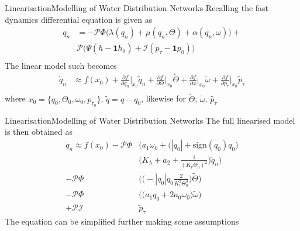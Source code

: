 \begin{frame}{Linearisation}{Modelling of Water Distribution Networks}
	Recalling the fast dynamics differential equation is given as
	\begin{equation}\label{eq:NonLinearModelSimplified}
		\begin{split}
			\dot{q}_n &=  -\mathcal{P}\Phi\Big(\lambda(q_n)+\mu(q_n,\Theta)+\alpha(q_n,\omega)\Big) +\\ &\mathcal{P}\Big(\Psi(\bar{h}-\mathbf{1}h_0) + \mathcal{I}(p_{\tau}-\mathbf{1}p_0)\Big) \\
		\end{split}	
	\end{equation}
	The linear model such becomes
	\begin{equation}\label{eq:SymbolicLinearisation}
		\begin{split}
			\dot{q}_n &\approx f(x_0) + \frac{\partial f}{\partial q_n}\bigg\rvert_{x_0} \tilde{q}_n + \frac{\partial f}{\partial \Theta}\bigg\rvert_{x_0} \tilde{\Theta} + \frac{\partial f}{\partial \omega}\bigg\rvert_{x_0} \tilde{\omega} +  \frac{\partial f}{\partial p_\tau}\bigg\rvert_{x_0} \tilde{p}_\tau
			\\
		\end{split}
	\end{equation}
	where $x_0 = \{q_0,\Theta_0,\omega_0, p_{\tau_0} \}$, $ \tilde{q} =q-q_0$, likewise for $ \tilde{\Theta} $, $ \tilde{\omega}$, $\tilde{p_{\tau}}  $
\end{frame}

\begin{frame}{Linearisation}{Modelling of Water Distribution Networks}
	The full linearised model is then obtained as
	\begin{equation}\label{eq:SymbolicLinearisationExpanded}
		\begin{split}
			\dot{q}_n \approx f(x_0) -\mathcal{P}\Phi & \Bigg(a_1\omega_0 + \Big(|q_0|+\text{sign}(q_0)q_0\Big)\\
			& \Bigg(K_\lambda + a_2 + \frac{1}{(K_v \Theta_0)^2}\Bigg) \tilde{q}_n \Bigg)  \\
			- \mathcal{P}\Phi&\Bigg(\Big(-|q_0|q_0 \frac{2}{K_v^2 \Theta_0^3}\Big) \tilde{\Theta}\Bigg) \\
			- \mathcal{P}\Phi&\Bigg(\Big(a_1 q_0 + 2a_0\omega_0\Big) \tilde{\omega}\Bigg) \\
			+ \mathcal{P} \mathcal{I}& \tilde{p}_\tau
		\end{split}
	\end{equation}
The equation can be simplified further making some assumptions
\end{frame}

